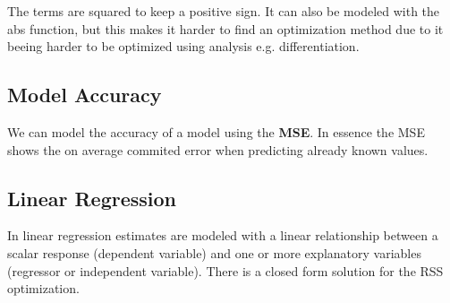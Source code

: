 \documentclass[../Main.tex]{subfiles}
\begin{document}
The terms are squared to keep a positive sign. It can also be modeled with the abs function, 
but this makes it harder to find an optimization method due to it beeing harder to be optimized using analysis e.g. differentiation.

\subsection{Model Accuracy}
We can model the accuracy of a model using the \textbf{MSE}.
In essence the MSE shows the on average commited error when predicting already known values.


\newpage
\subsection{Linear Regression}
In linear regression estimates are modeled with a linear relationship between a scalar response (dependent variable) 
and one or more explanatory variables (regressor or independent variable). There is a closed form solution for the RSS optimization.

\end{document}
